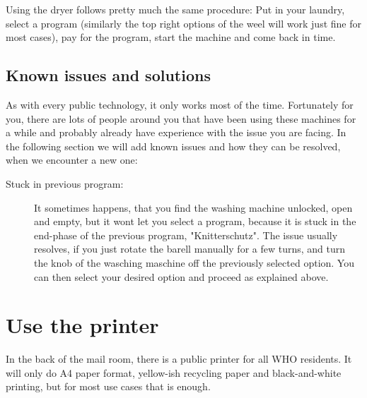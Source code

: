 Using the dryer follows pretty much the same procedure: Put in your laundry, select a program (similarly the top right options of the weel will work just fine for most cases), pay for the program, start the machine and come back in time.

\subsection{Known issues and solutions}
As with every public technology, it only works most of the time. Fortunately for you, there are lots of people around you that have been using these machines for a while and probably already have experience with the issue you are facing. In the following section we will add known issues and how they can be resolved, when we encounter a new one:
\begin{description}
    \item[Stuck in previous program:] It sometimes happens, that you find the washing machine unlocked, open and empty, but it wont let you select a program, because it is stuck in the end-phase of the previous program, "Knitterschutz". The issue usually resolves, if you just rotate the barell manually for a few turns, and turn the knob of the wasching maschine off the previously selected option. You can then select your desired option and proceed as explained above.
\end{description}

\section{Use the printer}
In the back of the mail room, there is a public printer for all WHO residents. It will only do A4 paper format, yellow-ish recycling paper and black-and-white printing, but for most use cases that is enough.

